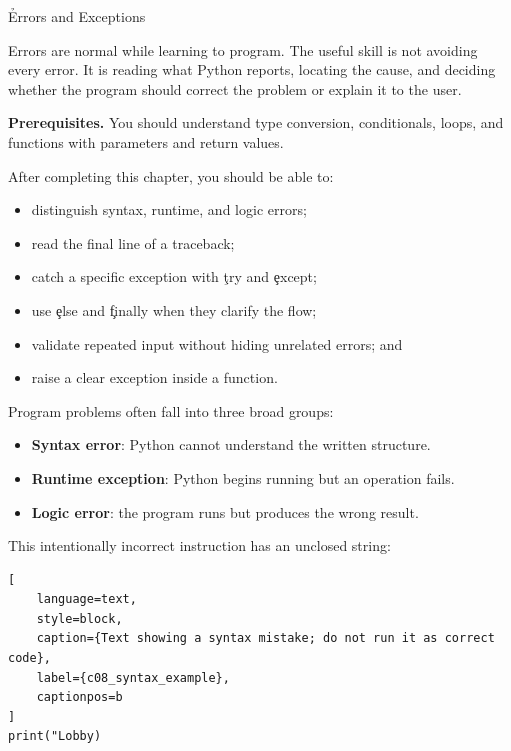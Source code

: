 
\h{Errors and Exceptions}
\label{ch:08}

Errors are normal while learning to program. The useful skill is not avoiding
every error. It is reading what Python reports, locating the cause, and deciding
whether the program should correct the problem or explain it to the user.

\begin{NoteBox}
\textbf{Prerequisites.} You should understand type conversion, conditionals,
loops, and functions with parameters and return values.
\end{NoteBox}

\begin{tcolorbox}[title=Learning outcomes,colframe=orange,colback=white,arc=2mm]
After completing this chapter, you should be able to:
\begin{itemize}
    \item distinguish syntax, runtime, and logic errors;
    \item read the final line of a traceback;
    \item catch a specific exception with \c{try} and \c{except};
    \item use \c{else} and \c{finally} when they clarify the flow;
    \item validate repeated input without hiding unrelated errors; and
    \item raise a clear exception inside a function.
\end{itemize}
\end{tcolorbox}


Program problems often fall into three broad groups:

\begin{itemize}
    \item \textbf{Syntax error}: Python cannot understand the written structure.
    \item \textbf{Runtime exception}: Python begins running but an operation fails.
    \item \textbf{Logic error}: the program runs but produces the wrong result.
\end{itemize}

This intentionally incorrect instruction has an unclosed string:

\begin{lstlisting}[
    language=text,
    style=block,
    caption={Text showing a syntax mistake; do not run it as correct code},
    label={c08_syntax_example},
    captionpos=b
]
print("Lobby)
\end{lstlisting}

